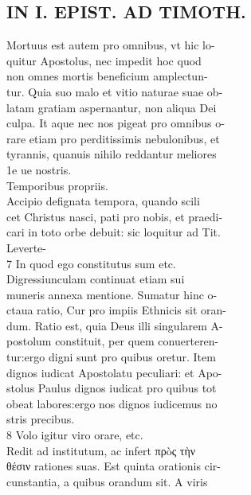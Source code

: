 \documentclass{article}
\begin{document}
\begin{pages}
\section*{IN I. EPIST. AD TIMOTH. \\
                }
Mortuus est autem pro omnibus, vt hic lo- \\
                quitur Apostolus, nec impedit hoc quod \\
                non omnes mortis beneficium amplectun- \\
                tur. Quia suo malo et vitio naturae suae ob- \\
                latam gratiam aspernantur, non aliqua Dei \\
                culpa. It aque nec nos pigeat pro omnibus o- \\
                rare etiam pro perditissimis nebulonibus, et \\
                tyrannis, quanuis nihilo reddantur meliores \\
                1e ue nostris. \\
                Temporibus propriis. \\
                Accipio defignata tempora, quando scili \\
                cet Christus nasci, pati pro nobis, et praedi- \\
                cari in toto orbe debuit: sic loquitur ad Tit. \\
                Leverte- \\
                7 In quod ego constitutus sum etc. \\
                Digressiunculam continuat etiam sui \\
                muneris annexa mentione. Sumatur hinc o- \\
                ctaua ratio, Cur pro impiis Ethnicis sit oran- \\
                dum. Ratio est, quia Deus illi singularem A- \\
                postolum constituit, per quem conuerteren- \\
                tur:ergo digni sunt pro quibus oretur. Item \\
                dignos iudicat Apostolatu peculiari: et Apo- \\
                stolus Paulus dignos iudicat pro quibus tot \\
                obeat labores:ergo nos dignos iudicemus no \\
                stris precibus. \\
                8 Volo igitur viro orare, etc. \\
                Redit ad institutum, ac infert πρòς τὴν \\
                θέσιν rationes suas. Est quinta orationis cir- \\
                cunstantia, a quibus orandum sit. A viris \\
                

\end{pages}
\end{document}
